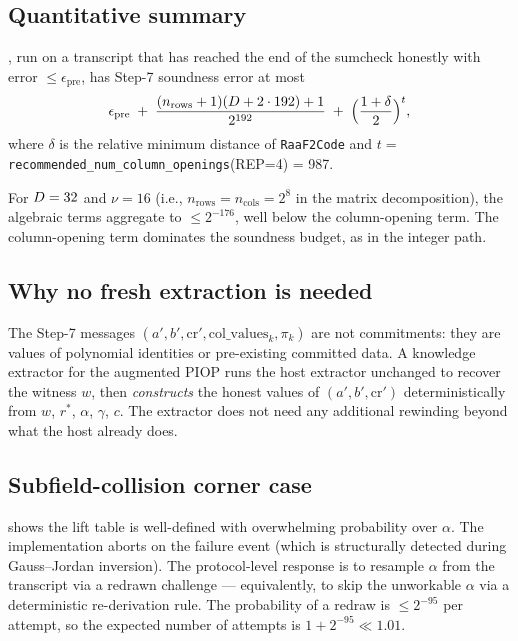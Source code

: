 \subsection{Quantitative summary}

\begin{proposition}
\label{prop:soundness}
, run on a transcript that has reached the end of the
sumcheck honestly with error $\le \epsilon_{\mathrm{pre}}$, has Step-7
soundness error at most
\[
  \epsilon_{\mathrm{pre}}
  \;+\;
  \frac{(n_{\mathrm{rows}} + 1)(D + 2 \cdot 192) + 1}{2^{192}}
  \;+\;
  \Bigl(\frac{1+\delta}{2}\Bigr)^{t},
\]
where $\delta$ is the relative minimum distance of \texttt{RaaF2Code}
and $t = $ \texttt{recommended\_num\_column\_openings}(REP=4) = 987.
\end{proposition}

For $D = 32$ and $\nu = 16$ (i.e., $n_{\mathrm{rows}} =
n_{\mathrm{cols}} = 2^{8}$ in the matrix decomposition), the
algebraic terms aggregate to $\le 2^{-176}$, well below the
column-opening term. The column-opening term dominates the soundness
budget, as in the integer path.

\subsection{Why no fresh extraction is needed}

The Step-7 messages $(a', b', \mathrm{cr}', \mathrm{col\_values}_k,
\pi_k)$ are not commitments: they are values of polynomial
identities or pre-existing committed data. A knowledge extractor for
the augmented PIOP runs the host extractor unchanged to recover the
witness $w$, then \emph{constructs} the honest values of
$(a', b', \mathrm{cr}')$ deterministically from $w$, $r^*$, $\alpha$,
$\gamma$, $c$. The extractor does not need any additional rewinding
beyond what the host already does.

\subsection{Subfield-collision corner case}

 shows the lift table is well-defined with
overwhelming probability over $\alpha$. The implementation aborts on
the failure event (which is structurally detected during
Gauss--Jordan inversion). The protocol-level response is to resample
$\alpha$ from the transcript via a redrawn challenge — equivalently,
to skip the unworkable $\alpha$ via a deterministic re-derivation
rule. The probability of a redraw is $\le 2^{-95}$ per attempt, so
the expected number of attempts is $1 + 2^{-95} \ll 1.01$.

